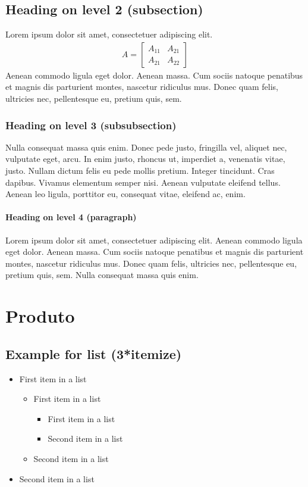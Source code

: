 \documentclass[paper=a4, fontsize=11pt]{scrartcl}
\numberwithin{equation}{section}		%
\numberwithin{figure}{section}			%
\numberwithin{table}{section}				%
\begin{document}
\subsection{Heading on level 2 (subsection)}
Lorem ipsum dolor sit amet, consectetuer adipiscing elit. 
\begin{align}
	A = 
	\begin{bmatrix}
	A_{11} & A_{21} \\
  	A_{21} & A_{22}
	\end{bmatrix}
\end{align}
Aenean commodo ligula eget dolor. Aenean massa. Cum sociis natoque penatibus et magnis dis parturient montes, nascetur ridiculus mus. Donec quam felis, ultricies nec, pellentesque eu, pretium quis, sem.

\subsubsection{Heading on level 3 (subsubsection)}
Nulla consequat massa quis enim. Donec pede justo, fringilla vel, aliquet nec, vulputate eget, arcu. In enim justo, rhoncus ut, imperdiet a, venenatis vitae, justo. Nullam dictum felis eu pede mollis pretium. Integer tincidunt. Cras dapibus. Vivamus elementum semper nisi. Aenean vulputate eleifend tellus. Aenean leo ligula, porttitor eu, consequat vitae, eleifend ac, enim.

\paragraph{Heading on level 4 (paragraph)}
Lorem ipsum dolor sit amet, consectetuer adipiscing elit. Aenean commodo ligula eget dolor. Aenean massa. Cum sociis natoque penatibus et magnis dis parturient montes, nascetur ridiculus mus. Donec quam felis, ultricies nec, pellentesque eu, pretium quis, sem. Nulla consequat massa quis enim. 


\section{Produto}

\subsection{Example for list (3*itemize)}
\begin{itemize}
	\item First item in a list 
		\begin{itemize}
		\item First item in a list 
			\begin{itemize}
			\item First item in a list 
			\item Second item in a list 
			\end{itemize}
		\item Second item in a list 
		\end{itemize}
	\item Second item in a list 
\end{itemize}
\end{document}
